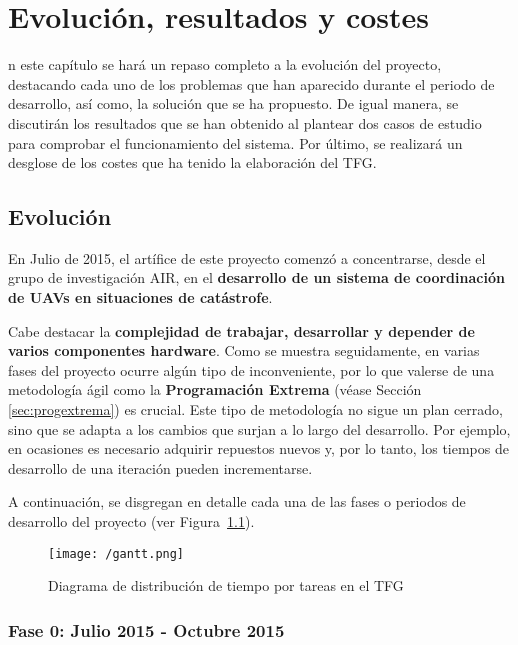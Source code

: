 \chapter{Evolución, resultados y costes}
\label{chap:resultados}

n este capítulo se hará un repaso completo a la evolución del proyecto, destacando cada uno de los problemas que han aparecido durante el periodo de desarrollo, así como, la solución que se ha propuesto. De igual manera, se discutirán los resultados que se han obtenido al plantear dos casos de estudio para comprobar el funcionamiento del sistema. Por último, se realizará un desglose de los costes que ha tenido la elaboración del \acs{TFG}.

\section{Evolución}
\label{sec:evolucion}

En Julio de 2015, el artífice de este proyecto comenzó a concentrarse, desde el grupo de investigación \acs{AIR}, en el \textbf{desarrollo de un sistema de coordinación de \acs{UAV}s en situaciones de catástrofe}.

Cabe destacar la \textbf{complejidad de trabajar, desarrollar y depender de varios componentes hardware}. Como se muestra seguidamente, en varias fases del proyecto ocurre algún tipo de inconveniente, por lo que valerse de una metodología ágil como la \textbf{Programación Extrema} (véase Sección \ref{sec:progextrema}) es crucial. Este tipo de metodología no sigue un plan cerrado, sino que se adapta a los cambios que surjan a lo largo del desarrollo. Por ejemplo, en ocasiones es necesario adquirir repuestos nuevos y, por lo tanto, los tiempos de desarrollo de una iteración pueden incrementarse.

A continuación, se disgregan en detalle cada una de las fases o periodos de desarrollo del proyecto (ver Figura~\ref{fig:gantt}). 

\begin{figure}[!h]
\begin{center}
\texttt{[image: /gantt.png]}
\caption[Diagrama de distribución de tiempo por tareas en el \acs{TFG}]{Diagrama de distribución de tiempo por tareas en el \acs{TFG}}
\label{fig:gantt}
\end{center}
\end{figure}

\subsection{Fase 0: Julio 2015 - Octubre 2015}
\label{sec:primeraetapa}

